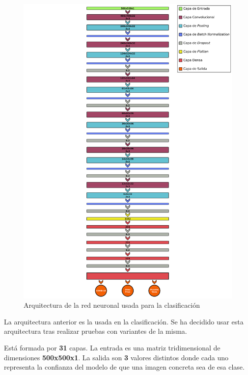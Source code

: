 \documentclass{uc3mpracticas}
\begin{document}
  \newpage

  \begin{figure}[H]
    \centering
    \includegraphics[width=\textwidth]{Images/CNN.png}
    \caption{Arquitectura de la red neuronal usada para la clasificación}
  \end{figure}

  \newpage

  La arquitectura anterior es la usada en la clasificación. Se ha decidido usar esta arquitectura tras realizar pruebas con variantes de la misma.

  \vspace{2mm}

  Está formada por \textbf{31} capas. La entrada es una matriz tridimensional de dimensiones \textbf{500x500x1}. La salida son \textbf{3} valores distintos donde cada uno representa la confianza del modelo de que una imagen concreta sea de esa clase.
\end{document}
